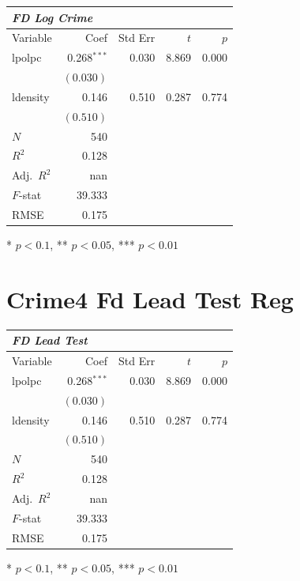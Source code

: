 \documentclass{article}
\begin{document}
\renewcommand{\arraystretch}{1.1}
\setlength{\tabcolsep}{6pt}
\begin{table}[H]
\centering
\begin{tabular}{lrrrr}
\hline
\multicolumn{5}{l}{\textit{FD Log Crime}} \\
\hline
Variable & Coef & Std Err & $t$ & $p$ \\
\hline
lpolpc & 0.268$^{\ast\ast\ast}$ & 0.030 & 8.869 & 0.000 \\
 & $(0.030)$ & & & \\
ldensity & 0.146 & 0.510 & 0.287 & 0.774 \\
 & $(0.510)$ & & & \\
\hline
$N$ & 540 & & & \\
$R^2$ & 0.128 & & & \\
Adj.\ $R^2$ & nan & & & \\
$F$-stat & 39.333 & & & \\
RMSE & 0.175 & & & \\
\hline
\end{tabular}
\end{table}
\vspace{2pt}
\begin{flushleft}\footnotesize{* $p<0.1$, ** $p<0.05$, *** $p<0.01$}\end{flushleft}

\clearpage
\section*{Crime4 Fd Lead Test Reg}

\renewcommand{\arraystretch}{1.1}
\setlength{\tabcolsep}{6pt}
\begin{table}[H]
\centering
\begin{tabular}{lrrrr}
\hline
\multicolumn{5}{l}{\textit{FD Lead Test}} \\
\hline
Variable & Coef & Std Err & $t$ & $p$ \\
\hline
lpolpc & 0.268$^{\ast\ast\ast}$ & 0.030 & 8.869 & 0.000 \\
 & $(0.030)$ & & & \\
ldensity & 0.146 & 0.510 & 0.287 & 0.774 \\
 & $(0.510)$ & & & \\
\hline
$N$ & 540 & & & \\
$R^2$ & 0.128 & & & \\
Adj.\ $R^2$ & nan & & & \\
$F$-stat & 39.333 & & & \\
RMSE & 0.175 & & & \\
\hline
\end{tabular}
\end{table}
\vspace{2pt}
\begin{flushleft}\footnotesize{* $p<0.1$, ** $p<0.05$, *** $p<0.01$}\end{flushleft}
\end{document}
